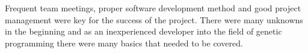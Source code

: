 Frequent team meetings, proper software development method and good project management were key for the success of the project.
There were many unknowns in the beginning and as an inexperienced developer into the field of genetic
programming there were many basics that needed to be covered.